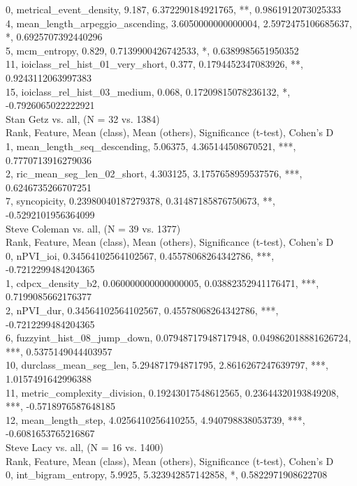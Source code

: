 0, metrical_event_density, 9.187, 6.372290184921765, **, 0.9861912073025333\\
4, mean_length_arpeggio_ascending, 3.6050000000000004, 2.5972475106685637, *, 0.6925707392440296\\
5, mcm_entropy, 0.829, 0.7139900426742533, *, 0.6389985651950352\\
11, ioiclass_rel_hist_01_very_short, 0.377, 0.1794452347083926, **, 0.9243112063997383\\
15, ioiclass_rel_hist_03_medium, 0.068, 0.17209815078236132, *, -0.7926065022222921\\
Stan Getz vs. all, (N = 32 vs. 1384)\\
Rank, Feature, Mean (class), Mean (others), Significance (t-test), Cohen's D\\
1, mean_length_seq_descending, 5.06375, 4.365144508670521, ***, 0.7770713916279036\\
2, ric_mean_seg_len_02_short, 4.303125, 3.1757658959537576, ***, 0.6246735266707251\\
7, syncopicity, 0.23980040187279378, 0.31487185876750673, **, -0.5292101956364099\\
Steve Coleman vs. all, (N = 39 vs. 1377)\\
Rank, Feature, Mean (class), Mean (others), Significance (t-test), Cohen's D\\
0, nPVI_ioi, 0.34564102564102567, 0.45578068264342786, ***, -0.7212299484204365\\
1, cdpcx_density_b2, 0.060000000000000005, 0.03882352941176471, ***, 0.7199085662176377\\
2, nPVI_dur, 0.34564102564102567, 0.45578068264342786, ***, -0.7212299484204365\\
6, fuzzyint_hist_08_jump_down, 0.07948717948717948, 0.049862018881626724, ***, 0.5375149044403957\\
10, durclass_mean_seg_len, 5.294871794871795, 2.8616267247639797, ***, 1.0157491642996388\\
11, metric_complexity_division, 0.19243017548612565, 0.23644320193849208, ***, -0.5718976587648185\\
12, mean_length_step, 4.0256410256410255, 4.940798838053739, ***, -0.6081653765216867\\
Steve Lacy vs. all, (N = 16 vs. 1400)\\
Rank, Feature, Mean (class), Mean (others), Significance (t-test), Cohen's D\\
0, int_bigram_entropy, 5.9925, 5.323942857142858, *, 0.5822971908622708\\
